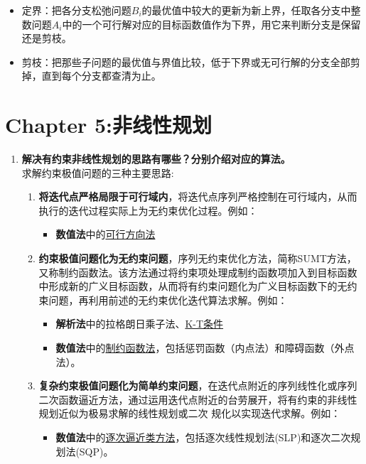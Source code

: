 \begin{enumerate}
\begin{itemize}
			\item 定界：把各分支松弛问题$B_i$的最优值中较大的更新为新上界，任取各分支中整数问题$A_i$中的一个可行解对应的目标函数值作为下界，用它来判断分支是保留还是剪枝。

			\item 剪枝：把那些子问题的最优值与界值比较，低于下界或无可行解的分支全部剪掉，直到每个分支都查清为止。
		\end{itemize}
	\end{enumerate}

	\section{Chapter 5:非线性规划}
	\begin{enumerate}
		\item \textbf{解决有约束非线性规划的思路有哪些？分别介绍对应的算法。}
		\\求解约束极值问题的三种主要思路:
		\begin{enumerate}
			\item \textbf{将迭代点严格局限于可行域内}，将迭代点序列严格控制在可行域内，从而执行的迭代过程实际上为无约束优化过程。例如：
			\begin{itemize}
			\item \textbf{数值法}中的\hyperref[sec:可行方向法]{可行方向法}
			\end{itemize}
			\item \textbf{约束极值问题化为无约束问题}，序列无约束优化方法，简称SUMT方法，又称制约函数法。该方法通过将约束项处理成制约函数项加入到目标函数中形成新的广义目标函数，从而将有约束问题化为广义目标函数下的无约束问题，再利用前述的无约束优化迭代算法求解。例如：
			\begin{itemize}
				\item \textbf{解析法}中的拉格朗日乘子法、\hyperref[sec:K-T条件]{K-T条件}
				\item \textbf{数值法}中的\hyperref[sec:制约函数法]{制约函数法}，包括惩罚函数（内点法）和障碍函数（外点法）。
			\end{itemize}
			\item \textbf{复杂约束极值问题化为简单约束问题}，在迭代点附近的序列线性化或序列二次函数逼近方法，通过运用迭代点附近的台劳展开，将有约束的非线性规划近似为极易求解的线性规划或二次
			规化以实现迭代求解。例如：
			\begin{itemize}
				\item \textbf{数值法}中的\hyperref[sec:逐次逼近类方法]{逐次逼近类方法}，包括逐次线性规划法(SLP)和逐次二次规划法(SQP)。
			\end{itemize}

\end{enumerate}
\end{enumerate}
